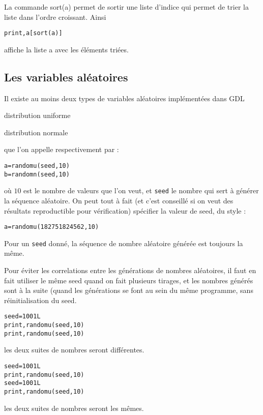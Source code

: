 \documentclass[a4paper,twoside]{article}
\begin{document}
\bigskip

La commande sort(a) permet de sortir une liste d'indice qui permet de trier la liste dans l'ordre croissant. Ainsi
\begin{verbatim}
print,a[sort(a)]
\end{verbatim}
affiche la liste a avec les éléments triées.

\subsection{Les variables aléatoires}
Il existe au moins deux types de variables aléatoires implémentées dans GDL
\begin{enuminline}
\item distribution uniforme
\item distribution normale
\end{enuminline}
que l'on appelle respectivement par :
\begin{verbatim}
a=randomu(seed,10)
b=randomn(seed,10)
\end{verbatim}
où $10$ est le nombre de valeurs que l'on veut, et \texttt{seed} le nombre qui sert à générer la séquence aléatoire. On peut tout à fait (et c'est conseillé si on veut des résultats reproductible pour vérification) spécifier la valeur de seed, du style :
\begin{verbatim}
a=randomu(182751824562,10)
\end{verbatim}

\begin{remarque}
Pour un \texttt{seed} donné, la séquence de nombre aléatoire générée est toujours la même.
\end{remarque}

Pour éviter les correlations entre les générations de nombres aléatoires, il faut en fait utiliser le même seed quand on fait plusieurs tirages, et les nombres générés sont à la suite (quand les générations se font au sein du même programme, sans réinitialisation du seed.

\begin{exemple}
\begin{verbatim}
seed=1001L
print,randomu(seed,10)
print,randomu(seed,10)
\end{verbatim}
les deux suites de nombres seront différentes.

\bigskip

\begin{verbatim}
seed=1001L
print,randomu(seed,10)
seed=1001L
print,randomu(seed,10)
\end{verbatim}
les deux suites de nombres seront les mêmes.
\end{exemple}
\end{document}
